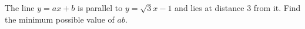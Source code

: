 The line $y=ax+b$ is parallel to $y=\sqrt3x-1$ and lies at distance $3$ from it. Find the minimum possible value of $ab$.
